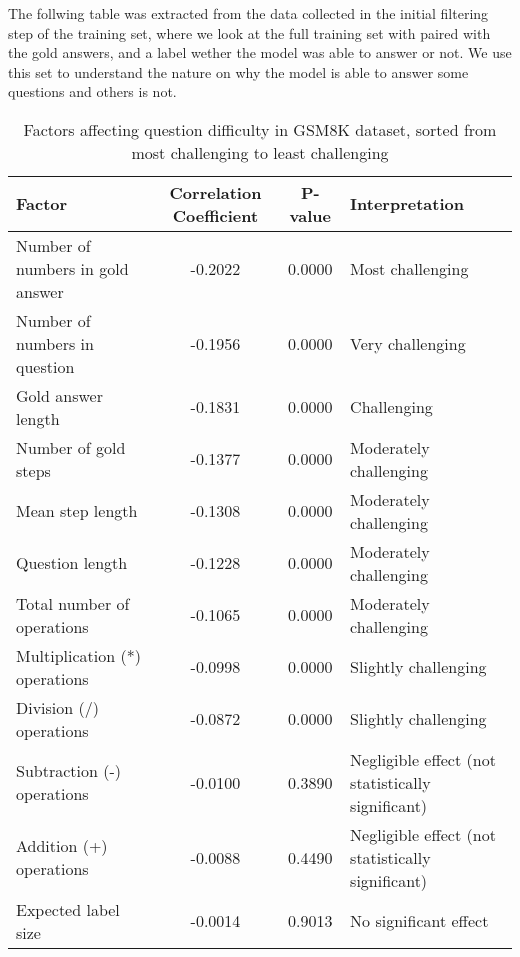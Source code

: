 \documentclass[a4paper,10pt]{article}
\begin{document}
The follwing table was extracted from the data collected in the initial filtering step of the training set, where we look at the full training set with paired with the gold answers, and a label wether the model was able to answer or not. We use this set to understand the nature on why the model is able to answer some questions and others is not.
\begin{table}[htbp]
\centering
\setlength{\tabcolsep}{4pt}  %
\begin{tabular}{|l|c|c|p{4.5cm}|}
\hline
\textbf{Factor} & \textbf{Correlation Coefficient} & \textbf{P-value} & \textbf{Interpretation} \\
\hline
Number of numbers in gold answer & -0.2022 & 0.0000 & Most challenging \\
Number of numbers in question & -0.1956 & 0.0000 & Very challenging \\
Gold answer length & -0.1831 & 0.0000 & Challenging \\
Number of gold steps & -0.1377 & 0.0000 & Moderately challenging \\
Mean step length & -0.1308 & 0.0000 & Moderately challenging \\
Question length & -0.1228 & 0.0000 & Moderately challenging \\
Total number of operations & -0.1065 & 0.0000 & Moderately challenging \\
Multiplication (*) operations & -0.0998 & 0.0000 & Slightly challenging \\
Division (/) operations & -0.0872 & 0.0000 & Slightly challenging \\
Subtraction (-) operations & -0.0100 & 0.3890 & Negligible effect (not statistically significant) \\
Addition (+) operations & -0.0088 & 0.4490 & Negligible effect (not statistically significant) \\
Expected label size & -0.0014 & 0.9013 & No significant effect \\
\hline
\end{tabular}
\caption{Factors affecting question difficulty in GSM8K dataset, sorted from most challenging to least challenging}
\label{tab:gsm8k_correlations}
\end{table}
\end{document}
